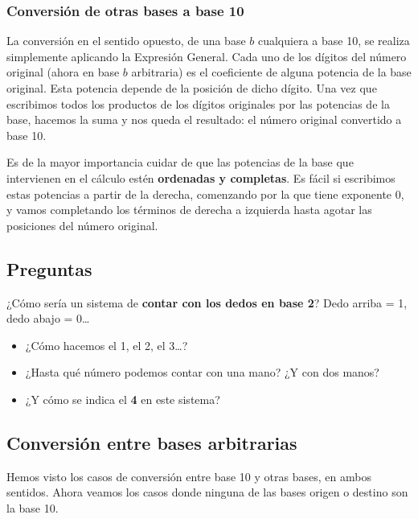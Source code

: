 \documentclass[spanish,a4paper,]{article}
\providecommand{\tightlist}{%
  \setlength{\itemsep}{0pt}\setlength{\parskip}{0pt}}
\begin{document}
\hypertarget{conversiuxf3n-de-otras-bases-a-base-10}{%
\subsubsection{Conversión de otras bases a base
10}\label{conversiuxf3n-de-otras-bases-a-base-10}}

La conversión en el sentido opuesto, de una base \(b\) cualquiera a base
10, se realiza simplemente aplicando la Expresión General. Cada uno de
los dígitos del número original (ahora en base \(b\) arbitraria) es el
coeficiente de alguna potencia de la base original. Esta potencia
depende de la posición de dicho dígito. Una vez que escribimos todos los
productos de los dígitos originales por las potencias de la base,
hacemos la suma y nos queda el resultado: el número original convertido
a base 10.

Es de la mayor importancia cuidar de que las potencias de la base que
intervienen en el cálculo estén \textbf{ordenadas y completas}. Es fácil
si escribimos estas potencias a partir de la derecha, comenzando por la
que tiene exponente 0, y vamos completando los términos de derecha a
izquierda hasta agotar las posiciones del número original.

\hypertarget{preguntas-1}{%
\subsection{Preguntas}\label{preguntas-1}}

¿Cómo sería un sistema de \textbf{contar con los dedos en base 2}? Dedo
arriba = 1, dedo abajo = 0\ldots{}

\begin{itemize}
\tightlist
\item
  ¿Cómo hacemos el 1, el 2, el 3\ldots{}?
\item
  ¿Hasta qué número podemos contar con una mano? ¿Y con dos manos?
\item
  ¿Y cómo se indica el \textbf{4} en este sistema?
\end{itemize}

\hypertarget{conversiuxf3n-entre-bases-arbitrarias}{%
\subsection{Conversión entre bases
arbitrarias}\label{conversiuxf3n-entre-bases-arbitrarias}}

Hemos visto los casos de conversión entre base 10 y otras bases, en
ambos sentidos. Ahora veamos los casos donde ninguna de las bases origen
o destino son la base 10.
\end{document}
